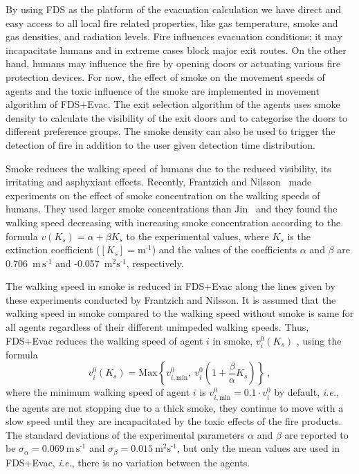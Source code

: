 \documentclass[12pt,a4paper,final,twoside]{stylevk}
\begin{document}
\noindent By using FDS as the platform of the evacuation calculation
we have direct and easy access to all local fire related properties,
like gas temperature, smoke and gas densities, and radiation levels.
Fire influences evacuation conditions; it may incapacitate humans and
in extreme cases block major exit routes.  On the other hand, humans
may influence the fire by opening doors or actuating various fire
protection devices.  For now, the effect of smoke on the movement
speeds of agents and the toxic influence of the smoke are implemented
in movement algorithm of FDS+Evac.  The exit selection algorithm of
the agents uses smoke density to calculate the visibility of the exit
doors and to categorise the doors to different preference groups.
The smoke density can also be used to trigger the detection of fire in
addition to the user given detection time distribution.


Smoke reduces the walking speed of humans due to the reduced
visibility, its irritating and asphyxiant effects.  Recently,
Frantzich and Nilsson~\cite{Frantzich03} made experiments on the
effect of smoke concentration on the walking speeds of humans.  They
used larger smoke concentrations than Jin~\cite{Jin78} and they found
the walking speed decreasing with increasing smoke concentration
according to the formula $v (K_s) = \alpha + \beta K_s $ to the
experimental values, where $K_s$ is the extinction coefficient ($[K_s]
\!\! = \!\!  \mathrm{ \textrm{m}^\textrm{-1} } $) and the values of
the coefficients $\alpha$ and $\beta$ are 0.706~$\mathrm{ \textrm{m}
  \, \textrm{s}^\textrm{-1} } $ and -0.057~$\mathrm{
  \textrm{m}^\textrm{2} \textrm{s}^\textrm{-1} } $, respectively.


The walking speed in smoke is reduced in FDS+Evac along the lines
given by these experiments conducted by Frantzich and Nilsson.  It is
assumed that the walking speed in smoke compared to the walking speed
without smoke is same for all agents regardless of their different
unimpeded walking speeds.  Thus, FDS+Evac reduces the walking speed of
agent $i$ in smoke, $v^0_i (K_s)$ , using the formula
%
\begin{equation}\label{Eq_SpeedSmoke}
  v^0_i (K_s) = \mathrm{Max} \left \{ v^0_{i,\mathrm{min}} ,~
  v^0_i \left ( 1 + \frac{\beta}{\alpha} K_s \right ) \right \} ~,
\end{equation}
%
where the minimum walking speed of agent $i$ is $ v^0_{i,\mathrm{min}}
= 0.1 \cdot v^0_i$ by default, \emph{i.e.}, the agents are not
stopping due to a thick smoke, they continue to move with a slow speed
until they are incapacitated by the toxic effects of the fire
products.  The standard deviations of the experimental parameters
$\alpha$ and $\beta$ are reported to be $\sigma_\alpha =
0.069~\mathrm{ \textrm{m} \, \textrm{s}^\textrm{-1} } $ and
$\sigma_\beta = 0.015~ \mathrm{ \textrm{m}^\textrm{2}
  \textrm{s}^\textrm{-1} } $, but only the mean values are used in
FDS+Evac, \emph{i.e.}, there is no variation between the agents.
\end{document}
